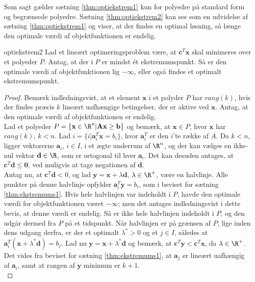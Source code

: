 %
%
%
Som sagt gælder sætning \ref{thm:optiekstrem1} kun for polyedre på standard form og begrænsede polyedre. 
Sætning \ref{thm:optiekstrem2} kan ses som en udvidelse af sætning \ref{thm:optiekstrem1} og viser, at der findes en optimal løsning, så længe den optimale værdi af objektfunktionen er endelig. 
\begin{thm}{}{optiekstrem2}
Lad et lineært optimeringsproblem være, at $\textbf{c}^T \textbf{x}$ skal minimeres over et polyeder $P$. 
Antag, at der i $P$ er mindst ét ekstremumspunkt. 
Så er den optimale værdi af objektfunktionen lig $- \infty$, eller også findes et optimalt ekstremumspunkt. 
\end{thm}
%
\begin{proof}
Bemærk indledningsvist, at et element $\textbf{x}$ i et polyder $P$ har $rang(k)$, hvis der findes præcis $k$ lineært uafhængige betingelser, der er aktive ved $\textbf{x}$. 
Antag, at den optimale værdi af objektfunktionen er endelig. \\
Lad et polyeder $P = \{\textbf{x} \in \R^n | \textbf{A}\textbf{x} \geq \textbf{b} \}$ og bemærk, at $\textbf{x} \in P$, hvor $\textbf{x}$ har $rang(k)$, $k < n$. 
Lad $i = \{ i | \textbf{a}^T_i \textbf{x} = b_i \}$, hvor $\textbf{a}^T_i$ er den $i$'te række af $A$. 
Da $k < n$, ligger vektorerne $\textbf{a}_i$, $i \in I$, i et ægte underrum af $ \R^n$, og der kan vælges en ikke-nul vektor $\textbf{d} \in \R$, som er ortogonal til hver $\textbf{a}_i$. 
Det kan desuden antages, at $\textbf{c}^T \textbf{d} \leq \textbf{0}$, ved muligvis at tage negationen af $\textbf{d}$. \\
Antag nu, at $\textbf{c}^T \textbf{d} < 0$, og lad $\textbf{y} = \textbf{x} + \lambda \textbf{d}$, $ \lambda \in \R^+$, være en halvlinje. 
Alle punkter på denne halvlinje opfylder $\textbf{a}^T_i \textbf{y} = b_i$, som i beviset for sætning \ref{thm:ekstremums1}. 
Hvis hele halvlinjen var indeholdt i $P$, havde den optimale værdi for objektfunktionen været $- \infty $; men det antages indledningsvist i dette bevis, at denne værdi er endelig. 
Så er ikke hele halvlinjen indeholdt i $P$, og den udgår dermed fra $P$ på et tidspunkt. 
Når halvlinjen er på grænsen af $P$, lige inden dens udgang derfra, er der et optimalt $ \lambda^* > 0$ og et $j \in I$, således at $\textbf{a}^T_i (\textbf{x} + \lambda^* \textbf{d} ) = b_j $.
Lad nu $\textbf{y} = \textbf{x} + \lambda^* \textbf{d} $ og bemærk, at $ \textbf{c}^T \textbf{y} < \textbf{c}^T \textbf{x}$, da $ \lambda \in \R^+ $. 
Det vides fra beviset for sætning \ref{thm:ekstremums1}, at $\textbf{a}_j$ er lineært uafhængig af $\textbf{a}_i$, samt at rangen af $\textbf{y}$ minimum er $k + 1$. \\

\end{proof}
